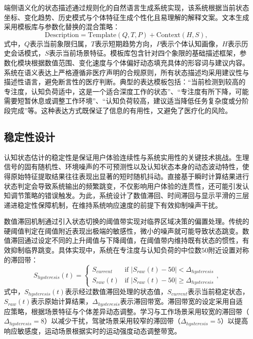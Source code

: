 端侧语义化的状态描述通过规则化的自然语言生成系统实现，该系统根据当前状态坐标、变化趋势、历史模式与个体特征生成个性化且易理解的解释文案。文本生成采用模板库与参数化替换的混合策略：
\begin{equation}
\text{Description} = \text{Template}(Q, T, P) + \text{Context}(H, S),
\end{equation}
式中，$Q$表示当前象限归属，$T$表示短期趋势方向，$P$表示个体认知画像，$H$表示历史会话模式，$S$表示当前场景特征。模板库包含针对四个象限的基础描述框架，参数化模块根据数值范围、变化速度与个体偏好动态填充具体的形容词与建议内容。
系统在语义表达上严格遵循非医疗声明的合规原则，所有状态描述均采用建议性与描述性语言，避免断言性的医疗判断。典型的表达模板包括：“当前检测到较高的专注度，认知负荷适中，这是一个适合深度工作的状态”、“专注度有所下降，可能需要短暂休息或调整工作环境”、“认知负荷较高，建议适当降低任务复杂度或分阶段完成”等。这种表达方式既保证了信息的有用性，又避免了医疗化的风险。

\subsection{稳定性设计}
认知状态估计的稳定性是保证用户体验连续性与系统实用性的关键技术挑战。生理信号的固有随机性、环境噪声的不可预测性以及认知状态本身的动态波动特性，使得原始特征提取结果往往表现出显著的短时随机抖动。直接基于瞬时计算结果进行状态判定会导致系统输出的频繁跳变，不仅影响用户体验的连贯性，还可能引发认知调节策略的错误触发。为此，系统设计了数值滞回、时间滞回与显示平滑的三层递进稳定性保障机制，在维持系统响应速度的前提下有效抑制噪声干扰。

数值滞回机制通过引入状态切换的阈值带实现对临界区域决策的偏置处理。传统的硬阈值判定在阈值附近表现出极端的敏感性，微小的噪声就可能导致状态跳变。数值滞回通过设定不同的上升阈值与下降阈值，在阈值带内维持既有状态的惯性，有效抑制临界跳变。具体实现中，系统在专注度与认知负荷的中位数$50$附近设置对称的滞回带：
\begin{equation}
S_{hysteresis}(t) = \begin{cases}
S_{current} & \text{if } |S_{raw}(t) - 50| < \Delta_{hysteresis} \\
S_{raw}(t) & \text{if } |S_{raw}(t) - 50| \geq \Delta_{hysteresis}
\end{cases},
\end{equation}
式中，$S_{hysteresis}(t)$表示经过数值滞回处理的状态值，$S_{current}$表示当前稳定状态，$S_{raw}(t)$表示原始计算结果，$\Delta_{hysteresis}$表示滞回带宽。滞回带宽的设定采用自适应策略，根据场景特征与个体差异动态调整。学习与工作场景采用较宽的滞回带（$\Delta_{hysteresis} = 8$）以减少干扰，驾驶场景采用较窄的滞回带（$\Delta_{hysteresis} = 5$）以提高响应敏感度，运动场景根据实时的运动强度动态调整带宽。

